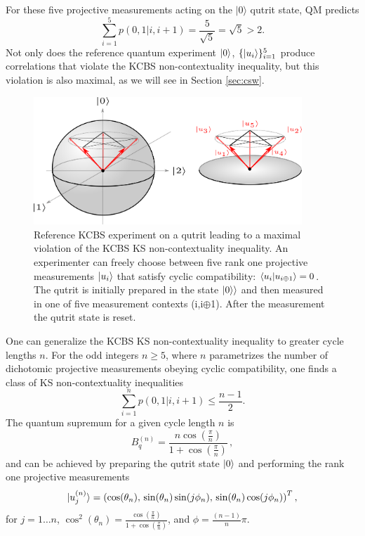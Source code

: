 For these five projective measurements acting on the $\vert 0\rangle$ qutrit state, QM predicts \begin{equation*}
\sum_{i=1}^5p(0,1\vert i, i+1)=\frac{5}{\sqrt{5}}=\sqrt{5}>2.    
\end{equation*}
Not only does the reference quantum experiment $\ket{0}$, $\{\ket{u_i}\}_{i=1}^5$ produce correlations that violate the KCBS non-contextuality inequality, but this violation is also maximal, as we will see in Section \ref{sec:csw}.

\begin{figure}
    \centering
    \includegraphics[width=0.9\textwidth]{images/kcbsref.png}
    \caption{Reference KCBS experiment on a qutrit leading to a maximal violation of the KCBS KS non-contextuality inequality. An experimenter can freely choose between five rank one projective measurements $\ket{u_i}$ that satisfy cyclic compatibility: $\bra{u_i}\ket{ u_{i\oplus1}} = 0$. The qutrit is initially prepared in the state $\ket{0\rangle}$ and then measured in one of five measurement contexts (i,i$\oplus$1). After the measurement the qutrit state is reset.}
    \label{fig:kcbsref}
\end{figure}

One can generalize the KCBS KS non-contextuality inequality to greater cycle lengths $n$. For the odd integers $n\geq 5$, where $n$ parametrizes the number of dichotomic projective measurements obeying cyclic compatibility, one finds a class of KS non-contextuality inequalities \cite{Bharti2019}
\begin{equation}
    \label{eqn:oddncycleclass}
    \sum_{i=1}^n p(0,1\vert i,i+1) \leq \frac{n-1}{2}.
\end{equation}
The quantum supremum for a given cycle length $n$ is
\begin{equation}
\label{eqn:ncyclequsup}
B_q^{(n)}=\frac{n\cos(\frac{\pi}{n})}{1+\cos(\frac{\pi}{n})}\,,
\end{equation} and can be achieved by preparing the qutrit state $\ket{0}$ and performing the rank one projective measurements
\begin{equation}
\label{eqn:ncycleideal}
\vert u_j^{(n)}\rangle = \left(\cos(\theta_n),\thinspace\sin(\theta_n)\sin(j\phi_n),\thinspace\sin(\theta_n)\cos(j\phi_n)\right)^T,
\end{equation}
for $j=1\dots n$, $\displaystyle\cos^2(\theta_n)=\frac{\cos(\frac{\pi}{n})}{1+\cos(\frac{\pi}{n})}$, and $\displaystyle\phi=\frac{(n-1)}{n}\pi$.

